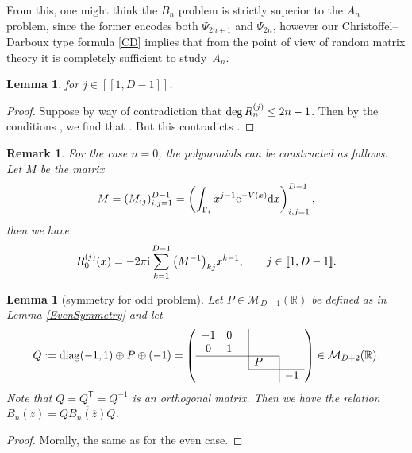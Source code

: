 \documentclass[pdftex]{sigma}
\numberwithin{equation}{section}
\newtheorem{Lemma}[Theorem]{Lemma}
\newtheorem{Remark}[Theorem]{Remark}
\newcommand*{\bord}{\multicolumn{1}{c|}{}}
\begin{document}
From this, one might think the $B_n$ problem is strictly superior to the $A_n$ problem, since the former encodes both $\Psi_{2n+1}$ and $\Psi_{2n}$, however our Christoffel--Darboux type formula \eqref{CD} implies that from the point of view of random matrix theory it is completely sufficient to study~$A_n$.
\begin{Lemma}  for $j \in [\![1, D-1]\!]$.
\end{Lemma}
\begin{proof}
Suppose by way of contradiction that $\smash{\deg R_n^{(j)}} \leq 2n-1$. Then by the conditions , we find that . But this contradicts .
\end{proof}

\begin{Remark}\label{zero} For the case $n=0$, the polynomials  can be constructed as follows. Let $M$ be the matrix
\begin{equation*}
M = (M_{ij})_{i,j=1}^{D-1} = \left( \int_{\Gamma_i} x^{j-1} {\rm e}^{-V(x)} {\rm d}x \right)_{i,j=1}^{D-1} ,
\end{equation*}
then we have
\begin{align*}
R^{(j)}_0(x) = - 2\pi {\rm i} \sum_{k=1}^{D-1} \big(M^{-1}\big)_{kj} x^{k-1},\qquad j \in [\![1,D-1]\!].
\end{align*}
\end{Remark}

\begin{Lemma}[symmetry for odd problem]\label{OddSymmetry} Let $P \in \mathcal{M}_{D-1}(\mathbb{R})$ be defined as in Lemma {\rm\ref{EvenSymmetry}} and let
\begin{equation*}
Q := \mathrm{diag}(-1,1) \oplus P \oplus (-1) = \left( \begin{array}{ccccccc} -1 & 0 & \bord & \\
0 & 1 & \bord & &\\ \cline{1-5}
& & \bord & P & \bord & \\\cline{4-6}
& & & & \bord & -1 \end{array} \right) \in \mathcal{M}_{D+2}(\mathbb{R}) .
\end{equation*}
Note that $Q = Q^\mathsf{T}= Q^{-1}$ is an orthogonal matrix. Then we have the relation $B_{n}(z) = Q \overline{B_{n}(\overline{z}) } Q$.
\end{Lemma}
\begin{proof}
Morally, the same as for the even case.
\end{proof}
\end{document}
